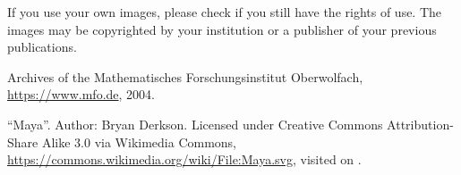 \documentclass{snapshotmfo}
\begin{document}
If you use your own images, please check if you still have the rights of use. The images may be copyrighted by your institution or a publisher of your previous publications.


\begin{imagecredits}
  \item[\Cref{fig.sample-image}] Archives of the Mathematisches Forschungsinstitut Oberwolfach,\\\url{https://www.mfo.de}, 2004.
  \item[\Cref{fig.maya}] ``Maya''. Author: Bryan Derkson. Licensed under Creative Commons Attribution-Share Alike 3.0 via Wikimedia Commons, \url{https://commons.wikimedia.org/wiki/File:Maya.svg}, visited on .
\end{imagecredits}
\end{document}
